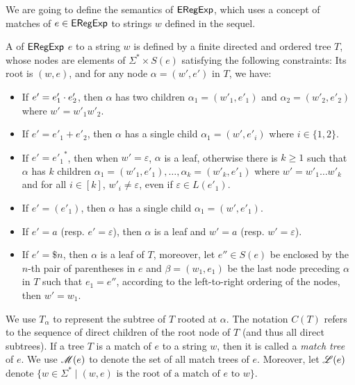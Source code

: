 We are going to define the semantics of ${\sf ERegExp}$, which uses a concept of matches of $e \in {\sf ERegExp}$ to strings $w$ defined in the sequel.
  
  \begin{definition}
  	A  of ${\sf ERegExp}$ $e$ to a string $w$ is defined by a finite directed and ordered
  	tree $T$, whose nodes are elements of $\Sigma^{\ast} \times S (e)$ satisfying the following constraints: Its root is $(w, e)$, and for any node $\alpha =
  	(w', e')$ in $T$, we have:
  	\begin{itemize}
  		\item If $e' = e'_1 \cdot e'_2$, then $\alpha$ has two children $\alpha_1 = (w'_1,
  		e'_1)$ and $\alpha_2=(w'_2, e'_2)$ where $w' = w'_1 w'_2$.
  		
  		\item If $e' = e'_1 + e'_2$, then $\alpha$ has a single child $\alpha_1 = (w',
  		e'_i)$ where $i \in \{ 1, 2 \}$.
  		
  		\item If $e' = {e'_1}^{\ast}$, then when $w' = \varepsilon$, $\alpha$ is a
  		leaf, otherwise there is $k \geqslant 1$ such that $\alpha$ has $k$ children $\alpha_1 = (w'_1,
  		e'_1), \ldots, \alpha_k = (w'_k, e'_1)$ where $w' = w'_1 \ldots w'_k$ and for all
  		$i \in [k]$, $w'_i \neq \varepsilon$, even if $\varepsilon \in L
  		(e'_1)$.
  		
  		\item If $e' = (e'_1)$, then $\alpha$ has a single child $\alpha_1 = (w', e'_1)$.
  		
  		\item If $e' = a$ (resp. $e' = \varepsilon$), then $\alpha$ is a leaf and
  		$w' = a$ (resp. $w' = \varepsilon$).
		
		\item If $e' = \$n$, then $\alpha$ is a leaf of $T$, moreover, let $e'' \in S(e)$ be enclosed by the $n$-th pair of parentheses in $e$ and $\beta = (w_1, e_1)$ be the last node preceding $\alpha$ in $T$ such that $e_1 = e''$, according to the left-to-right ordering of the nodes, then $w' = w_1$.
  	\end{itemize}
  	
 We use $T_\alpha$ to represent the subtree of $T$ rooted at $\alpha$.
	The notation $C(T)$ refers to the sequence of direct children of the root node of $T$
  	(and thus all direct subtrees).
 If a tree $T$ is a match of $e$ to a string $w$, then it is called a \emph{match tree} of $e$. We use $\mathscr{M}(e)$ to denote the set of all match trees of $e$.
Moreover,  let $\mathscr{L}(e)$ denote $\{w \in \Sigma^* \mid (w, e) \mbox{ is the root of a match of } e \mbox{ to } w\}$.
  \end{definition}
  
